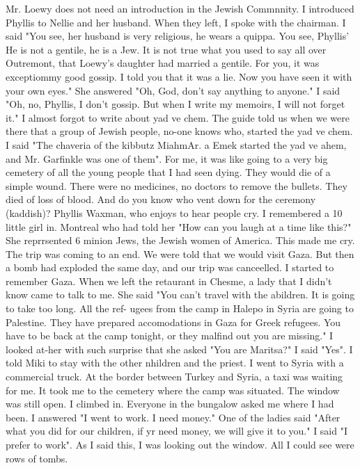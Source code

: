 Mr.
Loewy does not need an introduction in the 
Jewish Commnnity.
I introduced Phyllis to Nellie and her husband.
When they left, I 
spoke with the chairman.
I said "You see, her husband is very religious, he wears a 
quippa.
You see, Phyllis' He is not a gentile, he is a Jew.
It is not true what you 
used to say all over Outremont, that Loewy's daughter had married a gentile.
For you, it 
was exceptiommy good gossip.
I told you that it was a lie.
Now you have seen it with 
your own eyes."
She answered "Oh, God, don't say anything to anyone."
I said "Oh, no, 
Phyllis, I don't gossip.
But when I write my memoirs, I will not forget it."
I almost forgot to write about yad ve chem.
The guide told us when we were there 
that a group of Jewish people, no-one knows who, started the yad ve chem.
I said "The 
chaveria of the kibbutz MiahmAr.
a Emek started the yad ve ahem, and Mr.
Garfinkle was one 
of them".
For me, it was like going to a very big cemetery of all the young people that 
I had seen dying.
They would die of a simple wound.
There were no medicines, no doctors 
to remove the bullets.
They died of loss of blood.
And do you know who vent down for 
the ceremony (kaddish)?
Phyllis Waxman, who enjoys to hear people cry.
I remembered a 
10 little girl in.
Montreal who had told her "How can you laugh at a time like this?"
She 
reprrsented 6 minion Jews, the Jewish women of America.
This made me cry.
The trip was coming to an end.
We were told that we would visit Gaza.
But then a 
bomb had exploded the same day, and our trip was canceelled.
I started to remember Gaza.
When we left the retaurant in Chesme, a lady that I didn't know came to talk to me.
She said "You can't travel with the abildren.
It is going to take too long.
All the ref-
ugees from the camp in Halepo in Syria are going to Palestine.
They have prepared 
accomodations in Gaza for Greek refugees.
You have to be back at the camp tonight, or 
they malfind out you are missing."
I looked at-her with such surprise that she asked 
"You are Maritsa?"
I said "Yes".
I told Miki to stay with the other nhildren and the priest.
I went to Syria with 
a commercial truck.
At the border between Turkey and Syria, a taxi was waiting for me.
It took me to the cemetery where the camp was situated.
The window was still open.
I 
climbed in.
Everyone in the bungalow asked me where I had been.
I answered "I went to 
work.
I need money."
One of the ladies said "After what you did for our children, if yr 
need money, we will give it to you."
I said "I prefer to work".
As I said this, I was looking out the window.
All I could see were rows of tombs.
